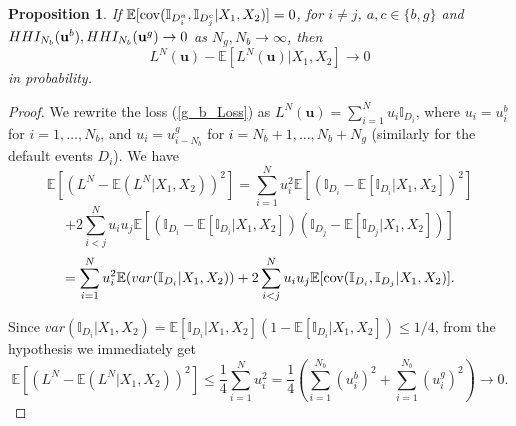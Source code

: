 \documentclass[preprint,12pt]{article}
\newcommand{\E}{\mathbb{E}}
\newcommand{\cov}{\mbox{\textrm{cov}}}
\newtheorem{Proposition}[Theorem]{Proposition}
\begin{document}
\begin{Proposition}\label{Convergence}
If $\E[\cov(\mathbb{I}_{D^a_i},\mathbb{I}_{D^c_j}|X_1, X_2)]=0$, for $i \neq j$, $a,c \in \{b,g \}$ and $HHI_{N_b}({\bf{u}}^b), HHI_{N_b}({\bf{u}}^g) \rightarrow 0$ as $N_g, N_b \to \infty$, then
$$
L^N(\mathbf{u}) - \E[L^N(\mathbf{u}) | X_1, X_2 ]\to 0
$$
in probability.
\end{Proposition}

\begin{proof} We rewrite the loss (\ref{g_b_Loss}) as $L^N(\mathbf{u}) = \sum_{i=1}^N u_i \mathbb{I}_{D_i}$, where $u_i = u_i^b$ for $i=1, \ldots, N_b$, and $u_i = u_{i-N_b}^g$ for $i=N_b+1, \ldots, N_b+N_g$ (similarly for the default events $D_i$). We have
$$
\E[(L^{N}-\E(L^N|X_1, X_2))^2]=\sum_{i=1}^N u_i^2 \E[(\mathbb{I}_{D_i}-\E[\mathbb{I}_{D_i}|X_1, X_2 ])^2]
$$
$$
+2 \sum_{i<j}^N u_i u_j \E[(\mathbb{I}_{D_i}-\E[\mathbb{I}_{D_i}|X_1, X_2 ]) (\mathbb{I}_{D_j} - \E[\mathbb{I}_{D_j}|X_1, X_2 ])]
$$
$$
=\sum_{i=1}^N u_i^2\E(var(\mathbb{I}_{D_i}|X_1, X_2 )) + 2 \sum_{i<j}^N u_i u_j  \E[\cov(\mathbb{I}_{D_i},\mathbb{I}_{D_j}|X_1, X_2)].
$$

Since $var(\mathbb{I}_{D_i}|X_1, X_2 ) = \E[\mathbb{I}_{D_i}|X_1, X_2 ] (1-\E[\mathbb{I}_{D_i}|X_1, X_2 ]) \leq 1/4$, from the hypothesis we
immediately get
$$
\E[(L^{N}-\E(L^N|X_1, X_2 ))^2] \leq \frac{1}{4}\sum^N_{i=1} u_i^2 = \frac{1}{4} \left(\sum^{N_b}_{i=1} (u_i^b)^2 + \sum^{N_b}_{i=1} (u_i^g)^2 \right) \to 0.
$$
\end{proof}
\end{document}
